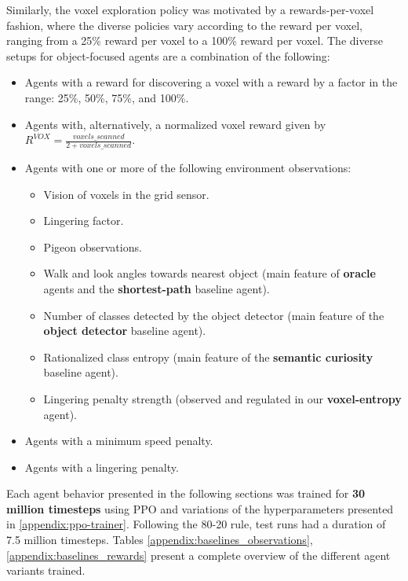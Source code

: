 Similarly, the voxel exploration policy was motivated by a rewards-per-voxel fashion, where the diverse policies vary according to the reward per voxel, ranging from a 25\% reward per voxel to a 100\% reward per voxel. 
The diverse setups for object-focused agents are a combination of the following:
\begin{itemize}
    \item Agents with a reward for discovering a voxel with a reward by a factor in the range: 25\%, 50\%, 75\%, and 100\%.
    \item Agents with, alternatively, a normalized voxel reward given by $ R^{VOX} = \frac{voxels\_scanned}{2 + voxels\_scanned} $.
    \item Agents with one or more of the following environment observations:
    \begin{itemize}
        \item Vision of voxels in the grid sensor.
        \item Lingering factor.
        \item Pigeon observations.
        \item Walk and look angles towards nearest object (main feature of \textbf{oracle} agents and the \textbf{shortest-path} baseline agent).
        \item Number of classes detected by the object detector (main feature of the \textbf{object detector} baseline agent).
        \item Rationalized class entropy (main feature of the \textbf{semantic curiosity} baseline agent).
        \item Lingering penalty strength (observed and regulated in our \textbf{voxel-entropy} agent).
    \end{itemize}
    \item Agents with a minimum speed penalty.
    \item Agents with a lingering penalty.
\end{itemize}

Each agent behavior presented in the following sections was trained for \textbf{30 million timesteps} using PPO and variations of the hyperparameters presented in \ref{appendix:ppo-trainer}. Following the 80-20 rule, test runs had a duration of 7.5 million timesteps. 
Tables \ref{appendix:baselines_observations}, \ref{appendix:baselines_rewards} present a complete overview of the different agent variants trained. 


